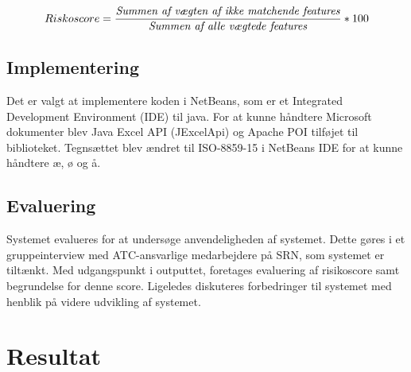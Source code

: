 \begin{equation}  \label{equ:risikoscore}
Riskoscore = \frac{\mbox{\textit{Summen af vægten af ikke matchende features}}}{\mbox{\textit{Summen af alle vægtede features}}} * 100
\end{equation}



\section{Implementering}
Det er valgt at implementere koden i NetBeans, som er et Integrated Development Environment (IDE) til java. For at kunne håndtere Microsoft dokumenter blev Java Excel API (JExcelApi) og Apache POI tilføjet til biblioteket. Tegnsættet blev ændret til ISO-8859-15 i NetBeans IDE for at kunne håndtere æ, ø og å. 

\section{Evaluering}
Systemet evalueres for at undersøge anvendeligheden af systemet. Dette gøres i et gruppeinterview med ATC-ansvarlige medarbejdere på SRN, som systemet er tiltænkt. Med udgangspunkt i outputtet, foretages evaluering af risikoscore samt begrundelse for denne score. Ligeledes   diskuteres forbedringer til systemet med henblik på videre udvikling af systemet. 

\chapter{Resultat}



